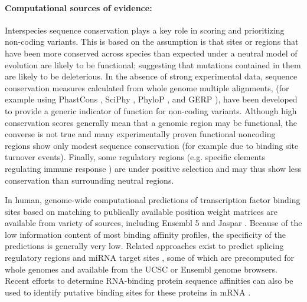 \paragraph{Computational sources of evidence:} Interspecies sequence conservation plays a key role in scoring and prioritizing non-coding variants. This is based on the assumption is that sites or regions that have been more conserved across species than expected under a neutral model of evolution are likely to be functional; suggesting that mutations contained in them are likely to be deleterious. In the absence of strong experimental data, sequence conservation measures calculated from whole genome multiple alignments, (for example using PhastCons  \cite{siepel2005evolutionarily}, SciPhy  \cite{garber2009identifying}, PhyloP  \cite{pollard2010detection} , and GERP  \cite{davydov2010identifying}), have been developed to provide a generic indicator of function for non-coding variants. Although high conservation scores generally mean that a genomic region may be functional, the converse is not true and many experimentally proven functional noncoding regions show only modest sequence conservation (for example due to binding site turnover events). Finally, some regulatory regions (e.g. specific elements regulating immune response  \cite{raj2013common}) are under positive selection and may thus show less conservation than surrounding neutral regions. 

In human, genome-wide computational predictions of transcription factor binding sites based on matching to publically available position weight matrices are available from variety of sources, including Ensembl 5 and Jaspar  \cite{bryne2008jaspar}.  Because of the low information content of most binding affinity profiles, the specificity of the predictions is generally very low. Related approaches exist to predict splicing regulatory regions  \cite{fairbrother2002predictive} and miRNA target sites \cite{ziebarth2011polymirts}, some of which are precomputed for whole genomes and available from the UCSC or Ensembl genome browsers. Recent efforts to determine RNA-binding protein sequence affinities can also be used to identify putative binding sites for these proteins in mRNA  \cite{ray2013compendium}.

